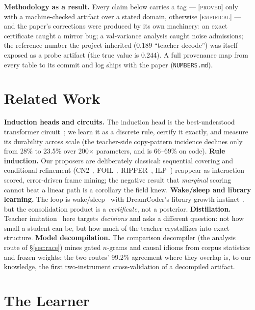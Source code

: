 \documentclass[sigconf,nonacm]{acmart}
\newcommand{\code}[1]{\texttt{#1}}
\newcommand{\tagp}[1]{\textsc{\small[#1]}}
\begin{document}
\textbf{Methodology as a result.} Every claim below carries a tag --- \tagp{proved} only with a
machine-checked artifact over a stated domain, otherwise \tagp{empirical} --- and the paper's
corrections were produced by its own machinery: an exact certificate caught a mirror bug; a
val-variance analysis caught noise admissions; the reference number the project inherited
($0.189$ ``teacher decode'') was itself exposed as a probe artifact (the true value is $0.244$).
A full provenance map from every table to its commit and log ships with the paper
(\code{NUMBERS.md}).

\section{Related Work}

\textbf{Induction heads and circuits.} The induction head is the best-understood transformer
circuit~\cite{elhage2021framework,olsson2022induction}; we learn it as a discrete rule, certify
it exactly, and measure its durability across scale (the teacher-side copy-pattern incidence
declines only from 28\% to 23.5\% over 200$\times$ parameters, and is 66--69\% on code).
\textbf{Rule induction.} Our proposers are deliberately classical: sequential covering and
conditional refinement (CN2~\cite{clark1989cn2}, FOIL~\cite{quinlan1990foil},
RIPPER~\cite{cohen1995ripper}, ILP~\cite{muggleton1991ilp}) reappear as interaction-scored,
error-driven frame mining; the negative result that \emph{marginal} scoring cannot beat a linear
path is a corollary the field knew. \textbf{Wake/sleep and library learning.} The loop is
wake/sleep~\cite{hintonwakesleep1995} with DreamCoder's library-growth
instinct~\cite{ellis2021dreamcoder}, but the consolidation product is a \emph{certificate}, not a
posterior. \textbf{Distillation.} Teacher imitation~\cite{hinton2015distilling} here targets
\emph{decisions} and asks a different question: not how small a student can be, but how much of
the teacher crystallizes into exact structure. \textbf{Model decompilation.} The comparison
decompiler (the analysis route of \S\ref{sec:race}) mines gated $n$-grams and causal idioms from
corpus statistics and frozen weights; the two routes' 99.2\% agreement where they overlap is, to
our knowledge, the first two-instrument cross-validation of a decompiled artifact.

\section{The Learner}
\label{sec:learner}
\end{document}
